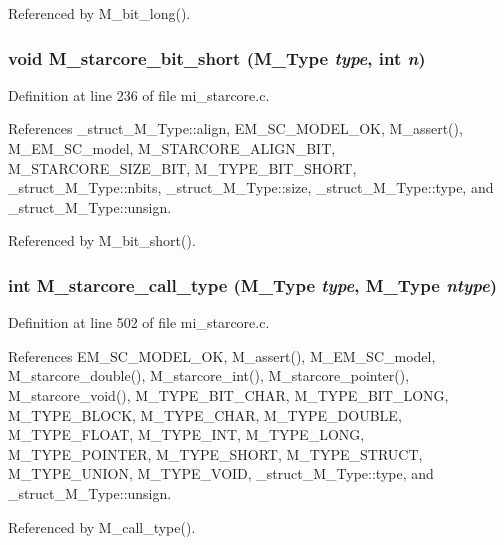 Referenced by M\_\-bit\_\-long().
\subsubsection{\setlength{\rightskip}{0pt plus 5cm}void M\_\-starcore\_\-bit\_\-short (\bf{M\_\-Type} {\em type}, int {\em n})}\label{mi__starcore_8c_2566e0afc1d6c6a6960477399f3ed1f2}




Definition at line 236 of file mi\_\-starcore.c.

References \_\-struct\_\-M\_\-Type::align, EM\_\-SC\_\-MODEL\_\-OK, M\_\-assert(), M\_\-EM\_\-SC\_\-model, M\_\-STARCORE\_\-ALIGN\_\-BIT, M\_\-STARCORE\_\-SIZE\_\-BIT, M\_\-TYPE\_\-BIT\_\-SHORT, \_\-struct\_\-M\_\-Type::nbits, \_\-struct\_\-M\_\-Type::size, \_\-struct\_\-M\_\-Type::type, and \_\-struct\_\-M\_\-Type::unsign.

Referenced by M\_\-bit\_\-short().
\subsubsection{\setlength{\rightskip}{0pt plus 5cm}int M\_\-starcore\_\-call\_\-type (\bf{M\_\-Type} {\em type}, \bf{M\_\-Type} {\em ntype})}\label{mi__starcore_8c_75df2a8c3079ec3f14b7f1171a7b08cd}




Definition at line 502 of file mi\_\-starcore.c.

References EM\_\-SC\_\-MODEL\_\-OK, M\_\-assert(), M\_\-EM\_\-SC\_\-model, M\_\-starcore\_\-double(), M\_\-starcore\_\-int(), M\_\-starcore\_\-pointer(), M\_\-starcore\_\-void(), M\_\-TYPE\_\-BIT\_\-CHAR, M\_\-TYPE\_\-BIT\_\-LONG, M\_\-TYPE\_\-BLOCK, M\_\-TYPE\_\-CHAR, M\_\-TYPE\_\-DOUBLE, M\_\-TYPE\_\-FLOAT, M\_\-TYPE\_\-INT, M\_\-TYPE\_\-LONG, M\_\-TYPE\_\-POINTER, M\_\-TYPE\_\-SHORT, M\_\-TYPE\_\-STRUCT, M\_\-TYPE\_\-UNION, M\_\-TYPE\_\-VOID, \_\-struct\_\-M\_\-Type::type, and \_\-struct\_\-M\_\-Type::unsign.

Referenced by M\_\-call\_\-type().
